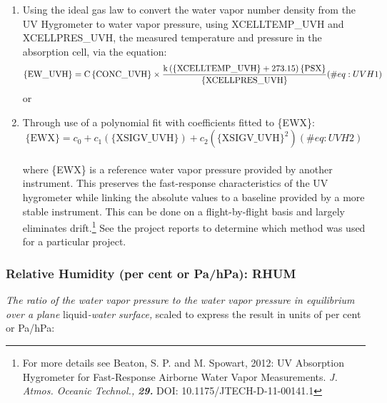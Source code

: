 \documentclass[
  english,
]{book}
\providecommand{\tightlist}{%
  \setlength{\itemsep}{0pt}\setlength{\parskip}{0pt}}
\begin{document}
\begin{enumerate}
\def\labelenumi{\arabic{enumi}.}
\tightlist
\item
  Using the ideal gas law to convert the water vapor number density from
  the UV Hygrometer to water vapor pressure, using XCELLTEMP\_UVH and
  XCELLPRES\_UVH, the measured temperature and pressure in the
  absorption cell, via the equation:\\
  \begin{equation}
  \mathrm{\{EW\_UVH\}=C\,\{CONC\_UVH\}\notag \\
  \times\frac{k\,(\mathrm{\{XCELLTEMP\_UVH\}+273.15)\,\mathrm{\{PSX\}}}}{\mathrm{{\{XCELLPRES\_UVH\}}}}}
  (\#eq:UVH1)
  \end{equation} or\\
\item
  Through use of a polynomial fit with coefficients fitted to \{EWX\}:\\
  \begin{equation}
  \mathrm{\{EWX\}}=c_0 + c_1(\mathrm{\{XSIGV\_UVH\}}) + c_2(\mathrm{\{XSIGV\_UVH\}}^2)
  (\#eq:UVH2)
  \end{equation}\\
  where \{EWX\} is a reference water vapor pressure provided by another
  instrument. This preserves the fast-response characteristics of the UV
  hygrometer while linking the absolute values to a baseline provided by
  a more stable instrument. This can be done on a flight-by-flight basis
  and largely eliminates drift.\footnote{For more details see Beaton, S.
    P. and M. Spowart, 2012: UV Absorption Hygrometer for Fast-Response
    Airborne Water Vapor Measurements. \emph{J. Atmos. Oceanic
    Technol.,} \textbf{\emph{29.}} DOI: 10.1175/JTECH-D-11-00141.1} See
  the project reports to determine which method was used for a
  particular project.
\end{enumerate}

\hypertarget{rhumw}{%
\subsubsection*{Relative Humidity (per cent or Pa/hPa):
RHUM}\label{rhumw}}

\emph{The ratio of the water vapor pressure to the water vapor pressure
in equilibrium over a plane} liquid\emph{-water surface,} scaled to
express the result in units of per cent or Pa/hPa:
\end{document}
